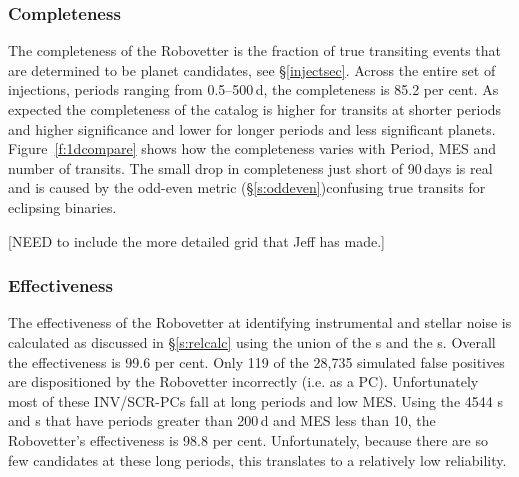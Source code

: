 
\subsubsection{Completeness}
The completeness of the Robovetter is the fraction of true transiting events that are determined to be planet candidates, see \S\ref{injectsec}.  
Across the entire set of injections, periods ranging from 0.5--500\,d, the completeness is 85.2 per cent. As expected the completeness of the catalog is higher for transits at shorter periods and higher significance and lower for longer periods and less significant planets. Figure~\ref{f:1dcompare} shows how the completeness varies with Period, MES and number of transits. The small drop in completeness just short of 90\,days is real and is caused by the odd-even metric (\S\ref{s:oddeven})confusing true transits for eclipsing binaries.  

[NEED to include the more detailed grid that Jeff has made.]

\subsubsection{Effectiveness}
The effectiveness of the Robovetter at identifying instrumental and stellar noise is calculated as discussed in \S\ref{s:relcalc} using the union of the \invtce s and the \scrtce s. Overall the effectiveness is 99.6 per cent.  Only 119 of the 28,735 simulated false positives are dispositioned by the Robovetter incorrectly (i.e. as a PC).  Unfortunately most of these INV/SCR-PCs fall at long periods and low MES.
Using the 4544 \invtce s and \scrtce s that have periods greater than 200\,d and MES less than 10, the Robovetter's effectiveness is 98.8 per cent.  Unfortunately, because there are so few candidates at these long periods, this translates to a relatively low reliability.

